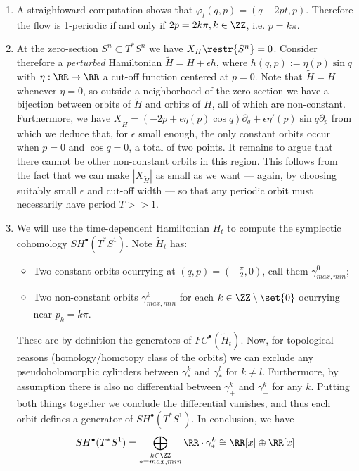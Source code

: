 
 
\begin{enumerate}
    \item A straighfoward computation shows that  $\varphi_t(q,p)=(q-2pt,p)$. Therefore the flow is 1-periodic if and only if
    $2p=2k\pi, k\in \ZZ$, i.e. $p=k\pi$.
    \item At the zero-section $S^n\subset T^*S^n$ we have $X_H\restr{S^n}=0$. Consider therefore a {\it perturbed} Hamiltonian $\tilde H=H+\epsilon h$, where $h(q,p):=\eta(p)\sin q$ with $\eta:\RR\to \RR$  a cut-off function centered at $p=0$. Note that $\tilde H=H$ whenever $\eta=0$, so outside a neighborhood of the zero-section we have a bijection between orbits of $\tilde H$ and orbits of $H$, all of which are non-constant. Furthermore, we have $X_{\tilde H}=(-2p+\epsilon\eta(p)\cos q)\partial_q +\epsilon\eta'(p)\sin q\partial_p$ from which we deduce that, for $\epsilon$ small enough, the only constant orbits occur when $p=0$ and $\cos q=0$, a total of two points. It remains to argue that there cannot be other non-constant orbits in this region. This follows from the fact that we can make $|X_{\tilde H}|$ as small as we want --- again, by choosing suitably small $\epsilon$ and cut-off width --- so that any periodic orbit must necessarily have period $T>>1$.
    
    \item We will use the time-dependent Hamiltonian $\tilde H_t$ to compute the symplectic cohomology $SH^\bullet(T^*S^1)$. Note $\tilde H_t$  has:
    \begin{itemize}
        \item Two constant orbits ocurrying at $(q,p)=\left(\pm \frac{\pi}{2},0\right)$, call them $\gamma^0_{max,min}$;
        \item Two non-constant orbits $\gamma_{max,min}^k$ for each $k\in \ZZ\setminus\set{0}$ ocurrying near $p_k=k\pi$.
    \end{itemize}
    These are by definition the generators of $FC^\bullet(\tilde H_t)$. Now, for topological reasons (homology/homotopy class of the orbits) we can exclude any pseudoholomorphic cylinders between $\gamma^k_*$ and $\gamma^l_*$ for $k\neq l$. Furthermore, by assumption there is also no differential between $\gamma^k_+$ and $\gamma^k_-$ for any $k$. Putting both things together we conclude the differential vanishes, and thus each orbit defines a generator of $SH^\bullet(T^*S^1)$. In conclusion, we have
    $$
    SH^\bullet(T^*S^1)=\bigoplus_{\substack{k\in\ZZ \\ *=max,min}}\RR\cdot \gamma^k_*\cong \RR[x]\oplus\RR[x]
    $$
    

\end{enumerate}
